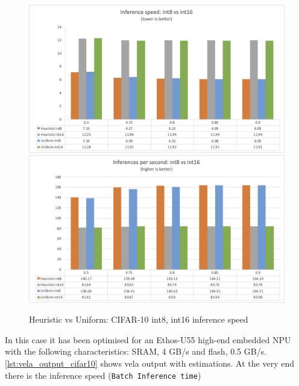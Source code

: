 \begin{figure}
    \centering
    {\includegraphics[width=1\linewidth]{images/experiments/cifar10_inf_speed.png}}
    {\includegraphics[width=1\linewidth]{images/experiments/cifar10_infs_second.png}}
    \caption{Heuristic vs Uniform: CIFAR-10 int8, int16 inference speed}\label{fig:cifar10_inf_speed}
\end{figure}

In this case it has been optimised for an Ethos-U55 high-end embedded NPU with
the following characteristics: SRAM, 4 GB/s and flash, 0.5 GB/s.
\autoref{lst:vela_output_cifar10} shows vela output with estimations. At the very end
there is the inference speed (\texttt{Batch Inference time})

